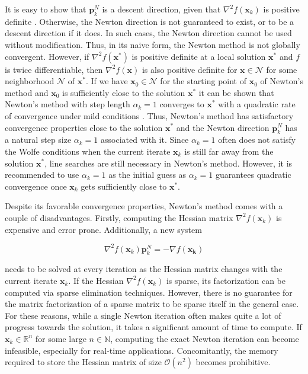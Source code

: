 It is easy to show that $\bm{p}^N_k$ is a descent direction, given that $\nabla^2 f(\bm{x}_k)$ is positive definite \cite{nocedal2006}. 
Otherwise, the Newton direction is not guaranteed to exist, or to be a descent direction if it does. In such cases, the Newton direction cannot 
be used without modification. Thus, in its naive form, the Newton method is not globally convergent. However, if $\nabla^2 f(\bm{x}^*)$ is positive
definite at a local solution $\bm{x}^*$ and $f$ is twice differentiable, then $\nabla^2 f(\bm{x})$ is also positive definite for $\bm{x} \in 
\mathcal{N}$ for some neighborhood $\mathcal{N}$ of $\bm{x}^*$. If we have $\bm{x}_0 \in \mathcal{N}$ for the starting point of $\bm{x}_0$
of Newton's method and $\bm{x}_0$ is sufficiently close to the solution $\bm{x}^*$ it can be shown that Newton's method with step length
$\alpha_k = 1$ converges to $\bm{x}^*$ with a quadratic rate of convergence under mild conditions \cite{nocedal2006}. Thus, Newton's method 
has satisfactory convergence properties close to the solution $\bm{x}^*$ and the Newton direction $\bm{p}^N_k$ has a natural step size 
$\alpha_k = 1$ associated with it. Since $\alpha_k = 1$ often does not satisfy the Wolfe conditions when the current iterate $\bm{x}_k$ is still 
far away from the solution $\bm{x}^*$, line searches are still necessary in Newton's method. However, it is recommended to use $\alpha_k = 1$ as the
initial guess as $\alpha_k = 1$ guarantees quadratic convergence once $\bm{x}_k$ gets sufficiently close to $\bm{x}^*$.

Despite its favorable convergence properties, Newton's method comes with a couple of disadvantages. Firstly, computing the Hessian matrix
$\nabla^2 f(\bm{x}_k)$ is expensive and error prone. Additionally, a new system 

\[
    \nabla^2 f(\bm{x}_k) \bm{p}^N_k = - \nabla f(\bm{x_k})
\]

\noindent needs to be solved at every iteration as the Hessian matrix changes with the current iterate $\bm{x}_k$.
If the Hessian $\nabla^2 f(\bm{x}_k)$ is sparse, its factorization can be computed via sparse elimination techniques. However, there is no
guarantee for the matrix factorization of a sparse matrix to be sparse itself in the general case.
For these reasons, while a single
Newton iteration often makes quite a lot of progress towards the solution, it takes a significant amount of time to compute. If $\bm{x}_k
\in \mathbb{R}^n$ for some large $n \in \mathbb{N}$, computing the exact Newton iteration can become infeasible, especially for real-time
applications. Concomitantly, the memory required to store the Hessian matrix of size $\mathcal{O}(n^2)$ becomes prohibitive.

